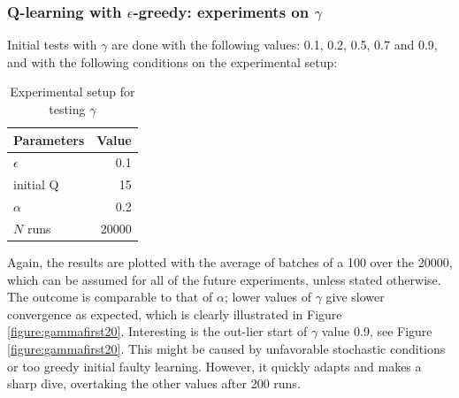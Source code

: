 \documentclass[paper=a4, fontsize=11pt]{scrartcl}
\numberwithin{equation}{section}		%
\numberwithin{figure}{section}			%
\numberwithin{table}{section}				%
\begin{document}
\subsubsection*{Q-learning with $\epsilon$-greedy: experiments on $\gamma$}
Initial tests with $\gamma$ are done with the following values: 0.1, 0.2, 0.5, 0.7 and 0.9, and with the following conditions on the experimental setup:
\begin{table}[H]
\caption{Experimental setup for testing $\gamma$}
\centering
\begin{tabular}{|l|r|}
\hline
Parameters & Value \\\hline
$\epsilon$ & 0.1 \\\hline
initial Q & 15 \\\hline
$\alpha$ & 0.2\\\hline
$N$ runs & 20000\\\hline
\end{tabular}
\label{expSetupGamma}
\end{table}
Again, the results are plotted with the average of batches of a 100 over the 20000, which can be assumed for all of the future experiments, unless stated otherwise. The outcome is comparable to that of $\alpha$; lower values of $\gamma$ give slower convergence as expected, which is clearly illustrated in Figure \ref{figure:gammafirst20}. Interesting is the out-lier start of $\gamma$ value 0.9, see Figure \ref{figure:gammafirst20}. This might be caused by unfavorable stochastic conditions or too greedy initial faulty learning. However, it quickly adapts and makes a sharp dive, overtaking the other values after 200 runs.
\end{document}
